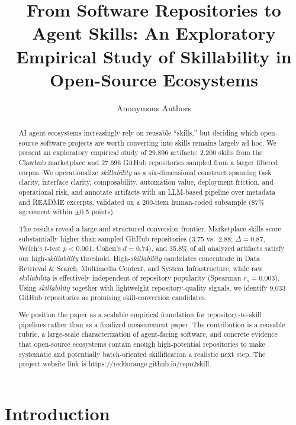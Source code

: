\documentclass[sigconf,review,anonymous,nonacm]{acmart}
\title{From Software Repositories to Agent Skills: An Exploratory Empirical Study of Skillability in Open-Source Ecosystems}
\author{Anonymous Authors}
\affiliation{
  \institution{Anonymous Institution(s)}
  \country{}
}
\newcommand{\skillability}{\textit{skillability}\xspace}
\begin{document}
\begin{abstract}
AI agent ecosystems increasingly rely on reusable ``skills,'' but deciding which open-source software projects are worth converting into skills remains largely ad hoc. We present an exploratory empirical study of 29,896 artifacts: 2,200 skills from the Clawhub marketplace and 27,696 GitHub repositories sampled from a larger filtered corpus. We operationalize \skillability as a six-dimensional construct spanning task clarity, interface clarity, composability, automation value, deployment friction, and operational risk, and annotate artifacts with an LLM-based pipeline over metadata and README excerpts, validated on a 200-item human-coded subsample (87\% agreement within $\pm$0.5 points).

The results reveal a large and structured conversion frontier. Marketplace skills score substantially higher than sampled GitHub repositories (3.75 vs.\ 2.88; $\Delta=0.87$, Welch's $t$-test $p<0.001$, Cohen's $d=0.74$), and 35.8\% of all analyzed artifacts satisfy our high-\skillability threshold. High-\skillability candidates concentrate in Data Retrieval \& Search, Multimedia Content, and System Infrastructure, while raw \skillability is effectively independent of repository popularity (Spearman $r_s=0.003$). Using \skillability together with lightweight repository-quality signals, we identify 9,033 GitHub repositories as promising skill-conversion candidates.

We position the paper as a scalable empirical foundation for repository-to-skill pipelines rather than as a finalized measurement paper. The contribution is a reusable rubric, a large-scale characterization of agent-facing software, and concrete evidence that open-source ecosystems contain enough high-potential repositories to make systematic and potentially batch-oriented skillification a realistic next step. The project website link is https://red0orange.github.io/repo2skill.
\end{abstract}


\maketitle

\section{Introduction}
\end{document}
